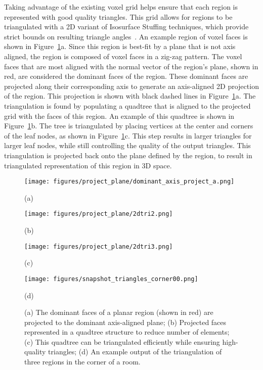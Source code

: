 \documentclass[10pt,twocolumn,letterpaper]{article}
\begin{document}
Taking advantage of the existing voxel grid helps ensure that each region is represented with good quality triangles.  This grid allows for regions to be triangulated with a 2D variant of Isosurface Stuffing techniques, which provide strict bounds on resulting triangle angles~\cite{Isostuffing}.  An example region of voxel faces is shown in Figure~\ref{fig:triangulation}a.  Since this region is best-fit by a plane that is not axis aligned, the region is composed of voxel faces in a zig-zag pattern.  The voxel faces that are most aligned with the normal vector of the region's plane, shown in red, are considered the dominant faces of the region.  These dominant faces are projected along their corresponding axis to generate an axis-aligned 2D projection of the region.  This projection is shown with black dashed lines in Figure~\ref{fig:triangulation}a.  The triangulation is found by populating a quadtree that is aligned to the projected grid with the faces of this region.  An example of this quadtree is shown in Figure~\ref{fig:triangulation}b.  The tree is triangulated by placing vertices at the center and corners of the leaf nodes, as shown in Figure~\ref{fig:triangulation}c.  This step results in larger triangles for larger leaf nodes, while still controlling the quality of the output triangles.  This triangulation is projected back onto the plane defined by the region, to result in triangulated representation of this region in 3D space.

\begin{figure}[t]

	\begin{minipage}[b]{0.48\linewidth}
		\centerline{\texttt{[image: figures/project\_plane/dominant\_axis\_project\_a.png]}}
		\centerline{(a)}\medskip
	\end{minipage}
	\hfill
	\begin{minipage}[b]{0.48\linewidth}
		\centerline{\texttt{[image: figures/project\_plane/2dtri2.png]}}
		\centerline{(b)}\medskip
	\end{minipage}
	
	\begin{minipage}[b]{0.48\linewidth}
		\centerline{\texttt{[image: figures/project\_plane/2dtri3.png]}}
		\centerline{(c)}\medskip
	\end{minipage}
	\hfill
	\begin{minipage}[b]{0.48\linewidth}
		\centerline{\texttt{[image: figures/snapshot\_triangles\_corner00.png]}}
		\centerline{(d)}\medskip
	\end{minipage}

	\caption{(a) The dominant faces of a planar region (shown in red) are projected to the dominant axis-aligned plane; (b) Projected faces represented in a quadtree structure to reduce number of elements; (c) This quadtree can be triangulated efficiently while ensuring high-quality triangles; (d) An example output of the triangulation of three regions in the corner of a room.}
	\label{fig:triangulation}

\end{figure}
\end{document}
